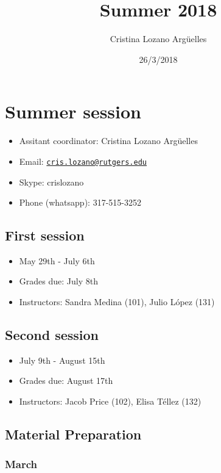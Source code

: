 \documentclass[]{article}
\title{Summer 2018}
\author{Cristina Lozano Argüelles}
\date{26/3/2018}
\providecommand{\tightlist}{%
  \setlength{\itemsep}{0pt}\setlength{\parskip}{0pt}}
\begin{document}
\maketitle

\section{Summer session}\label{summer-session}

\begin{itemize}
\tightlist
\item
  Assitant coordinator: Cristina Lozano Argüelles
\item
  Email:
  \href{mailto:cris.lozano@rutgers.edu}{\nolinkurl{cris.lozano@rutgers.edu}}
\item
  Skype: crislozano
\item
  Phone (whatsapp): 317-515-3252
\end{itemize}

\subsection{First session}\label{first-session}

\begin{itemize}
\tightlist
\item
  May 29th - July 6th
\item
  Grades due: July 8th
\item
  Instructors: Sandra Medina (101), Julio López (131)
\end{itemize}

\subsection{Second session}\label{second-session}

\begin{itemize}
\tightlist
\item
  July 9th - August 15th
\item
  Grades due: August 17th
\item
  Instructors: Jacob Price (102), Elisa Téllez (132)
\end{itemize}

\subsection{Material Preparation}\label{material-preparation}

\subsubsection{March}\label{march}
\end{document}
